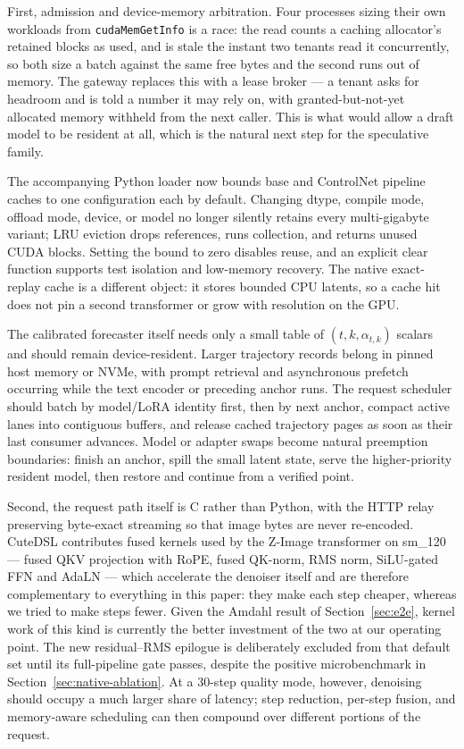 \documentclass[11pt,a4paper]{article}
\begin{document}
First, admission and device-memory arbitration. Four processes sizing their own
workloads from \texttt{cudaMemGetInfo} is a race: the read counts a caching
allocator's retained blocks as used, and is stale the instant two tenants read
it concurrently, so both size a batch against the same free bytes and the second
runs out of memory. The gateway replaces this with a lease broker --- a tenant
asks for headroom and is told a number it may rely on, with granted-but-not-yet
allocated memory withheld from the next caller. This is what would allow a draft
model to be resident at all, which is the natural next step for the speculative
family.

The accompanying Python loader now bounds base and ControlNet pipeline caches
to one configuration each by default. Changing dtype, compile mode, offload
mode, device, or model no longer silently retains every multi-gigabyte variant;
LRU eviction drops references, runs collection, and returns unused CUDA blocks.
Setting the bound to zero disables reuse, and an explicit clear function supports
test isolation and low-memory recovery. The native exact-replay cache is a
different object: it stores bounded CPU latents, so a cache hit does not pin a
second transformer or grow with resolution on the GPU.

The calibrated forecaster itself needs only a small table of
$(t,k,\alpha_{t,k})$ scalars and should remain device-resident. Larger trajectory
records belong in pinned host memory or NVMe, with prompt retrieval and
asynchronous prefetch occurring while the text encoder or preceding anchor
runs. The request scheduler should batch by model/LoRA identity first, then by
next anchor, compact active lanes into contiguous buffers, and release cached
trajectory pages as soon as their last consumer advances. Model or adapter
swaps become natural preemption boundaries: finish an anchor, spill the small
latent state, serve the higher-priority resident model, then restore and
continue from a verified point.

Second, the request path itself is C rather than Python, with the HTTP relay
preserving byte-exact streaming so that image bytes are never re-encoded.
CuteDSL contributes fused kernels used by the Z-Image transformer on sm\_120 ---
fused QKV projection with RoPE, fused QK-norm, RMS norm, SiLU-gated FFN and
AdaLN --- which accelerate the denoiser itself and are therefore complementary to
everything in this paper: they make each step cheaper, whereas we tried to make
steps fewer. Given the Amdahl result of Section~\ref{sec:e2e}, kernel work of
this kind is currently the better investment of the two at our operating point.
The new residual--RMS epilogue is deliberately excluded from that default set
until its full-pipeline gate passes, despite the positive microbenchmark in
Section~\ref{sec:native-ablation}.
At a 30-step quality mode, however, denoising should occupy a much larger share
of latency; step reduction, per-step fusion, and memory-aware scheduling can
then compound over different portions of the request.
\end{document}
